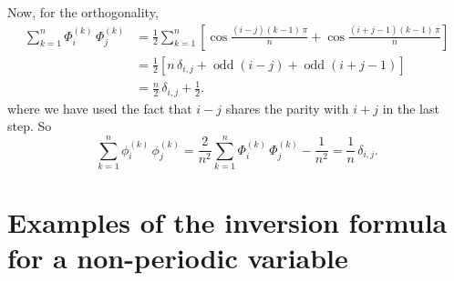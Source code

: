 \documentclass[preprint, floatfix]{revtex4-1}
\begin{document}
{  Now, for the orthogonality,
  $$
  \begin{aligned}
    \sum_{k = 1}^n
    \Phi^{(k)}_i \, \Phi^{(k)}_j
    &=
    \frac 1 2
    \sum_{k = 1}^n
    \left[
      \cos \tfrac{ (i - j) (k - 1) \, \pi }
                 {         n              }
      +
      \cos \tfrac{ (i + j - 1) (k - 1) \, \pi }
                 {             n              }
    \right]
    \\
    &=
    \frac 1 2
    \left[
      n \, \delta_{i, j}
      +
      \operatorname{odd}(i - j)
      +
      \operatorname{odd}(i + j - 1)
    \right]
    \\
    &=
    \frac n 2 \, \delta_{i, j}
    + \frac 1 2.
  \end{aligned}
  $$
  where we have used the fact
  that $i - j$ shares the parity with $i + j$
  in the last step.
  So
  $$
    \sum_{k = 1}^n
    \phi^{(k)}_i \, \phi^{(k)}_j
    =
    \frac 2 { n^2 }
    \sum_{k = 1}^n
    \Phi^{(k)}_i \, \Phi^{(k)}_j
    -
    \frac 1 { n^2 }
    =
    \frac 1 n \,
    \delta_{i, j}.
  $$
}
%


\section{Examples of the inversion formula
for a non-periodic variable}
\end{document}
